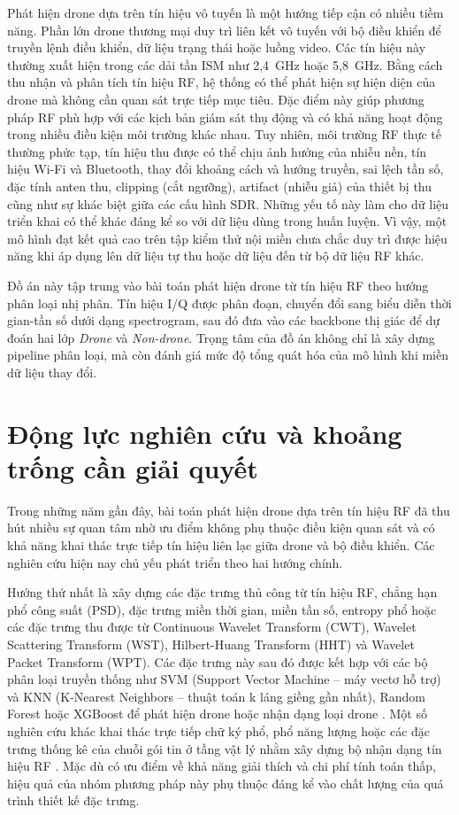 \documentclass[../DoAn.tex]{subfiles}
\begin{document}
Phát hiện drone dựa trên tín hiệu vô tuyến là một hướng tiếp cận có nhiều tiềm năng. Phần lớn drone thương mại duy trì liên kết vô tuyến với bộ điều khiển để truyền lệnh điều khiển, dữ liệu trạng thái hoặc luồng video. Các tín hiệu này thường xuất hiện trong các dải tần ISM như 2,4~GHz hoặc 5,8~GHz. Bằng cách thu nhận và phân tích tín hiệu RF, hệ thống có thể phát hiện sự hiện diện của drone mà không cần quan sát trực tiếp mục tiêu. Đặc điểm này giúp phương pháp RF phù hợp với các kịch bản giám sát thụ động và có khả năng hoạt động trong nhiều điều kiện môi trường khác nhau. Tuy nhiên, môi trường RF thực tế thường phức tạp, tín hiệu thu được có thể chịu ảnh hưởng của nhiễu nền, tín hiệu Wi-Fi và Bluetooth, thay đổi khoảng cách và hướng truyền, sai lệch tần số, đặc tính anten thu, clipping (cắt ngưỡng), artifact (nhiễu giả) của thiết bị thu cũng như sự khác biệt giữa các cấu hình SDR. Những yếu tố này làm cho dữ liệu triển khai có thể khác đáng kể so với dữ liệu dùng trong huấn luyện. Vì vậy, một mô hình đạt kết quả cao trên tập kiểm thử nội miền chưa chắc duy trì được hiệu năng khi áp dụng lên dữ liệu tự thu hoặc dữ liệu đến từ bộ dữ liệu RF khác.

Đồ án này tập trung vào bài toán phát hiện drone từ tín hiệu RF theo hướng phân loại nhị phân. Tín hiệu I/Q được phân đoạn, chuyển đổi sang biểu diễn thời gian-tần số dưới dạng spectrogram, sau đó đưa vào các backbone thị giác để dự đoán hai lớp \textit{Drone} và \textit{Non-drone}. Trọng tâm của đồ án không chỉ là xây dựng pipeline phân loại, mà còn đánh giá mức độ tổng quát hóa của mô hình khi miền dữ liệu thay đổi.

\section{Động lực nghiên cứu và khoảng trống cần giải quyết}
\label{sec:giaiphap}
Trong những năm gần đây, bài toán phát hiện drone dựa trên tín hiệu RF đã thu hút nhiều sự quan tâm nhờ ưu điểm không phụ thuộc điều kiện quan sát và có khả năng khai thác trực tiếp tín hiệu liên lạc giữa drone và bộ điều khiển. Các nghiên cứu hiện nay chủ yếu phát triển theo hai hướng chính.

Hướng thứ nhất là xây dựng các đặc trưng thủ công từ tín hiệu RF, chẳng hạn phổ công suất (PSD), đặc trưng miền thời gian, miền tần số, entropy phổ hoặc các đặc trưng thu được từ Continuous Wavelet Transform (CWT), Wavelet Scattering Transform (WST), Hilbert-Huang Transform (HHT) và Wavelet Packet Transform (WPT). Các đặc trưng này sau đó được kết hợp với các bộ phân loại truyền thống như SVM (Support Vector Machine – máy vectơ hỗ trợ) và KNN (K-Nearest Neighbors – thuật toán k láng giềng gần nhất), Random Forest hoặc XGBoost để phát hiện drone hoặc nhận dạng loại drone \cite{swinney2021interference,medaiyese2021machine,nguyen2025effective}. Một số nghiên cứu khác khai thác trực tiếp chữ ký phổ, phổ năng lượng hoặc các đặc trưng thống kê của chuỗi gói tin ở tầng vật lý nhằm xây dựng bộ nhận dạng tín hiệu RF \cite{alsaad2019rfbased,ezuma2020rf,basak2022combined,morgerollet2022physical}. Mặc dù có ưu điểm về khả năng giải thích và chi phí tính toán thấp, hiệu quả của nhóm phương pháp này phụ thuộc đáng kể vào chất lượng của quá trình thiết kế đặc trưng.
\end{document}
